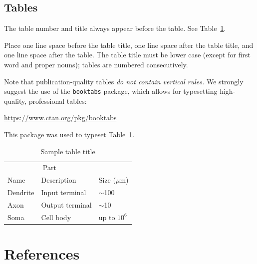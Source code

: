 \documentclass{article}
\begin{document}
\subsection{Tables}

The table
number and title always appear before the table.  See
Table~\ref{sample-table}.

Place one line space before the table title, one line space after the
table title, and one line space after the table. The table title must
be lower case (except for first word and proper nouns); tables are
numbered consecutively.

Note that publication-quality tables \emph{do not contain vertical
  rules.} We strongly suggest the use of the \verb+booktabs+ package,
which allows for typesetting high-quality, professional tables:
\begin{center}
  \url{https://www.ctan.org/pkg/booktabs}
\end{center}
This package was used to typeset Table~\ref{sample-table}.

\begin{table}[t]
  \caption{Sample table title}
  \centering
  \begin{tabular}{lll}
    \toprule
    \multicolumn{2}{c}{Part}                   \\
    \cmidrule{1-2}
    Name     & Description     & Size ($\mu$m) \\
    \midrule
    Dendrite & Input terminal  & $\sim$100     \\
    Axon     & Output terminal & $\sim$10      \\
    Soma     & Cell body       & up to $10^6$  \\
    \bottomrule
  \end{tabular}
  \label{sample-table}
\end{table}

\section{References}


\end{document}
